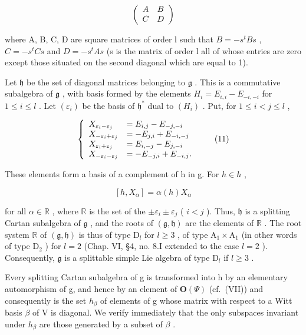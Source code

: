 \[
\left( \begin{array}{c c} A & B \\ C & D \end{array} \right)
\]

where A, B, C, D are square matrices of order l such that \(B = -s^{t}Bs\) , \(C = -s^{t}Cs\) and \(D = -s^{t}As\) (s is the matrix of order l all of whose entries are zero except those situated on the second diagonal which are equal to 1).

Let \(\mathfrak{h}\) be the set of diagonal matrices belonging to \(\mathfrak{g}\) . This is a commutative subalgebra of \(\mathfrak{g}\) , with basis formed by the elements \(H_{i} = E_{i,i} - E_{-i,-i}\) for \(1 \leq i \leq l\) . Let \((\varepsilon_{i})\) be the basis of \(\mathfrak{h}^{*}\) dual to \((H_{i})\) . Put, for \(1 \leq i < j \leq l\) ,

\[
\left\{ \begin{array}{l l} X _ {\varepsilon_ {i} - \varepsilon_ {j}} & = E _ {i, j} - E _ {- j, - i} \\ X _ {- \varepsilon_ {i} + \varepsilon_ {j}} & = - E _ {j, i} + E _ {- i, - j} \\ X _ {\varepsilon_ {i} + \varepsilon_ {j}} & = E _ {i, - j} - E _ {j, - i} \\ X _ {- \varepsilon_ {i} - \varepsilon_ {j}} & = - E _ {- j, i} + E _ {- i, j}. \end{array} \right.\tag{11}
\]

These elements form a basis of a complement of h in g. For \(h \in h\) ,

\[
[ h, X _ {\alpha} ] = \alpha (h) X _ {\alpha}
\]

for all \(\alpha \in \mathbb{R}\) , where \(\mathbb{R}\) is the set of the \(\pm \varepsilon_i \pm \varepsilon_j\) ( \(i < j\) ). Thus, \(\mathfrak{h}\) is a splitting Cartan subalgebra of \(\mathfrak{g}\) , and the roots of \((\mathfrak{g}, \mathfrak{h})\) are the elements of \(\mathbb{R}\) . The root system \(\mathbb{R}\) of \((\mathfrak{g}, \mathfrak{h})\) is thus of type \(\mathrm{D}_l\) for \(l \geq 3\) , of type \(\mathrm{A}_1 \times \mathrm{A}_1\) (in other words of type \(\mathrm{D}_2\) ) for \(l = 2\) (Chap. VI, §4, no. 8.I extended to the case \(l = 2\) ). Consequently, \(\mathfrak{g}\) is a splittable simple Lie algebra of type \(\mathrm{D}_l\) if \(l \geq 3\) .

Every splitting Cartan subalgebra of g is transformed into h by an elementary automorphism of g, and hence by an element of \(\mathbf{O}(\varPsi)\) (cf.~(VII)) and consequently is the set \(h_{\beta}\) of elements of g whose matrix with respect to a Witt basis \(\beta\) of V is diagonal. We verify immediately that the only subspaces invariant under \(h_{\beta}\) are those generated by a subset of \(\beta\) .


